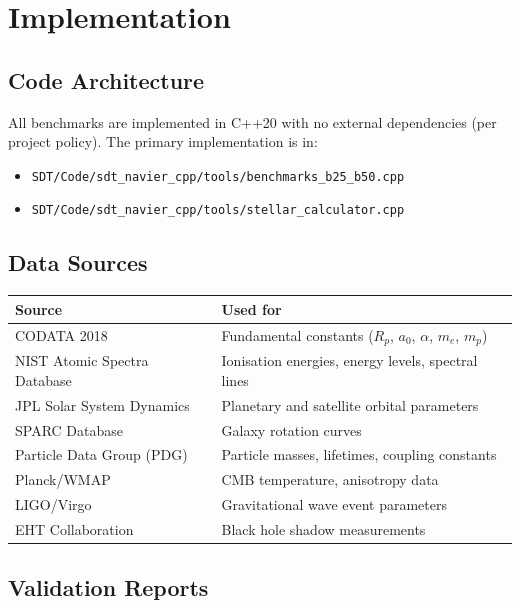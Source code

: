 \documentclass[12pt,a4paper]{report}
\begin{document}
\chapter{Implementation}
\label{ch:implementation}

\section{Code Architecture}

All benchmarks are implemented in C++20 with no external dependencies (per project policy). The primary implementation is in:
\begin{itemize}
  \item \texttt{SDT/Code/sdt\_navier\_cpp/tools/benchmarks\_b25\_b50.cpp}
  \item \texttt{SDT/Code/sdt\_navier\_cpp/tools/stellar\_calculator.cpp}
\end{itemize}

\section{Data Sources}

\begin{center}
\begin{tabular}{ll}
\toprule
\textbf{Source} & \textbf{Used for} \\
\midrule
CODATA 2018 & Fundamental constants ($R_p$, $a_0$, $\alpha$, $m_e$, $m_p$) \\
NIST Atomic Spectra Database & Ionisation energies, energy levels, spectral lines \\
JPL Solar System Dynamics & Planetary and satellite orbital parameters \\
SPARC Database & Galaxy rotation curves \\
Particle Data Group (PDG) & Particle masses, lifetimes, coupling constants \\
Planck/WMAP & CMB temperature, anisotropy data \\
LIGO/Virgo & Gravitational wave event parameters \\
EHT Collaboration & Black hole shadow measurements \\
\bottomrule
\end{tabular}
\end{center}

\section{Validation Reports}
\end{document}

